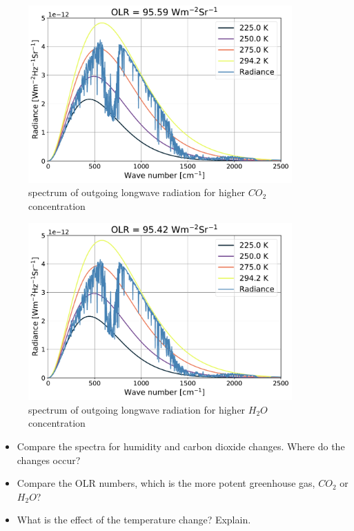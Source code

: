 \documentclass[paper=a4, fontsize=11pt]{scrartcl} %
\begin{document}
\begin{figure}[h]
\centering
    \includegraphics[width=0.9\textwidth]{plots/olr_+CO2.pdf}
    \caption{spectrum of outgoing longwave radiation for higher $CO_{2}$ concentration}
\end{figure}

\begin{figure}[h]
\centering
    \includegraphics[width=0.9\textwidth]{plots/olr_+H2O.pdf}
    \caption{spectrum of outgoing longwave radiation for higher $H_{2}O$ concentration}
\end{figure}

\begin{itemize}
    \item Compare the spectra for humidity and carbon dioxide changes. Where do the changes occur?
    \item Compare the OLR numbers, which is the more potent greenhouse gas, $CO_{2}$ or $H_{2}O$?
    \item What is the effect of the temperature change? Explain.
\end{itemize}
\end{document}
